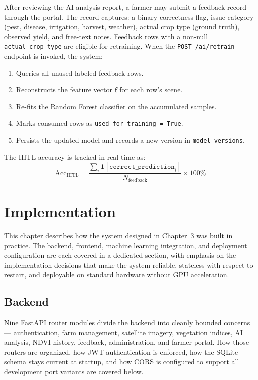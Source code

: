 \documentclass[12pt,a4paper,oneside]{report}
\begin{document}
After reviewing the AI analysis report, a farmer may submit a feedback record through
the portal. The record captures: a binary correctness flag, issue category (pest,
disease, irrigation, harvest, weather), actual crop type (ground truth), observed
yield, and free-text notes. Feedback rows with a non-null \texttt{actual\_crop\_type}
are eligible for retraining. When the \texttt{POST /ai/retrain} endpoint is invoked,
the system:

\begin{enumerate}
  \item Queries all unused labeled feedback rows.
  \item Reconstructs the feature vector $\mathbf{f}$ for each row's scene.
  \item Re-fits the Random Forest classifier on the accumulated samples.
  \item Marks consumed rows as \texttt{used\_for\_training = True}.
  \item Persists the updated model and records a new version in \texttt{model\_versions}.
\end{enumerate}

The HITL accuracy is tracked in real time as:
\begin{equation}
\mathrm{Acc}_\mathrm{HITL} =
\frac{\sum_i \mathbf{1}[\texttt{correct\_prediction}_i]}{N_\mathrm{feedback}} \times 100\%
\label{eq:hitl_acc}
\end{equation}

\chapter{Implementation}

This chapter describes how the system designed in Chapter~3 was built in practice. The backend, frontend, machine learning integration, and deployment configuration are each covered in a dedicated section, with emphasis on the implementation decisions that make the system reliable, stateless with respect to restart, and deployable on standard hardware without GPU acceleration.

\section{Backend}

Nine FastAPI router modules divide the backend into cleanly bounded concerns — authentication, farm management, satellite imagery, vegetation indices, AI analysis, NDVI history, feedback, administration, and farmer portal. How those routers are organized, how JWT authentication is enforced, how the SQLite schema stays current at startup, and how CORS is configured to support all development port variants are covered below.
\end{document}
